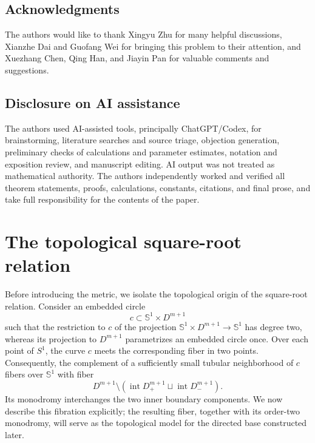 \documentclass[11pt,reqno]{amsart}
\theoremstyle{definition}
\numberwithin{equation}{section}
\begin{document}
\subsection*{Acknowledgments}
The authors would like to thank Xingyu Zhu for many helpful discussions, Xianzhe Dai and Guofang Wei for bringing this problem to their attention, and Xuezhang Chen, Qing Han, and Jiayin Pan for valuable comments and suggestions.



\subsection*{Disclosure on AI assistance}

The authors used AI-assisted tools, principally ChatGPT/Codex, for
brainstorming, literature searches and source triage, objection
generation, preliminary checks of calculations and parameter
estimates, notation and exposition review, and manuscript editing.
AI output was not treated as mathematical authority.  The authors
independently worked and verified all theorem statements, proofs,
calculations, constants, citations, and final prose, and take full
responsibility for the contents of the paper.


\section{The topological square-root relation}
\label{sec:double-cable}

Before introducing the metric, we isolate the topological origin of the
square-root relation. Consider an embedded circle
\[
c\subset\mathbb S^{1}\times D^{m+1}
\]
such that the restriction to \(c\) of the projection
\(\mathbb S^{1}\times D^{m+1}\to\mathbb S^{1}\) has degree two, whereas its projection
to \(D^{m+1}\) parametrizes an embedded circle once. Over each point of
\(S^{1}\), the curve \(c\) meets the corresponding fiber in two points.
Consequently, the complement of a sufficiently small tubular
neighborhood of \(c\) fibers over \(\mathbb S^{1}\) with fiber
\[
D^{m+1}\setminus
\left(
\operatorname{int}D^{m+1}_{+}
\sqcup
\operatorname{int}D^{m+1}_{-}
\right).
\]
Its monodromy interchanges the two inner boundary components. We now
describe this fibration explicitly; the resulting fiber, together with
its order-two monodromy, will serve as the topological model for the
directed base constructed later.
\end{document}
